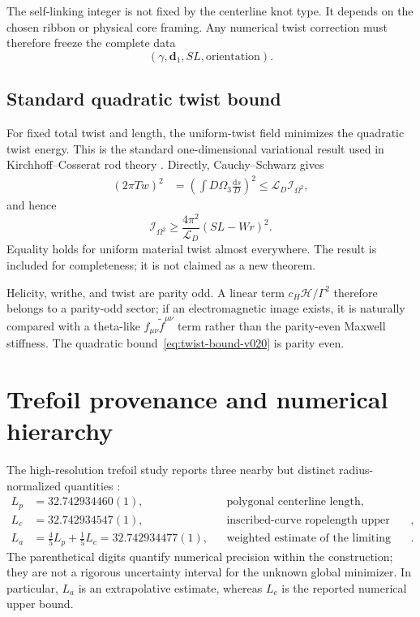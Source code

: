 \documentclass[aps,pre,preprint,notitlepage,nofootinbib,superscriptaddress]{revtex4-2}
\newcommand{\dd}{\mathrm d}
\newcommand{\calH}{\mathcal H}
\newcommand{\calL}{\mathcal L}
\newcommand{\calI}{\mathcal I}
\begin{document}
The self-linking integer is not fixed by the centerline knot type.  It depends on the chosen ribbon or physical core framing.  Any numerical twist correction must therefore freeze the complete data
\begin{equation}
  (\gamma,\bm d_1,SL,\text{orientation}).
\end{equation}

\subsection{Standard quadratic twist bound}

For fixed total twist and length, the uniform-twist field minimizes the quadratic twist energy.  This is the standard one-dimensional variational result used in Kirchhoff--Cosserat rod theory \cite{Antman2005}.  Directly, Cauchy--Schwarz gives
\begin{align}
  (2\pi Tw)^2
  &=\left(\int D\Omega_3\frac{\dd s}{D}\right)^2
  \leq \calL_D\calI_{\Omega^2},
\end{align}
and hence
\begin{equation}
  \boxed{
  \calI_{\Omega^2}\geq
  \frac{4\pi^2}{\calL_D}(SL-Wr)^2.}
  \label{eq:twist-bound-v020}
\end{equation}
Equality holds for uniform material twist almost everywhere.  The result is included for completeness; it is not claimed as a new theorem.

Helicity, writhe, and twist are parity odd.  A linear term $c_H\calH/\Gamma^2$ therefore belongs to a parity-odd sector; if an electromagnetic image exists, it is naturally compared with a theta-like $f_{\mu\nu}\widetilde f^{\mu\nu}$ term rather than the parity-even Maxwell stiffness.  The quadratic bound~\eqref{eq:twist-bound-v020} is parity even.

\section{Trefoil provenance and numerical hierarchy}
\label{sec:provenance}

The high-resolution trefoil study reports three nearby but distinct radius-normalized quantities \cite{PrzybylPieranski2014}:
\begin{align}
  L_p&=32.742934460(1), &&\text{polygonal centerline length},\\
  L_c&=32.742934547(1), &&\text{inscribed-curve ropelength upper bound},\\
  L_a&=\frac45L_p+\frac15L_c=32.742934477(1),
      &&\text{weighted estimate of the limiting value}.
\end{align}
The parenthetical digits quantify numerical precision within the construction; they are not a rigorous uncertainty interval for the unknown global minimizer.  In particular, $L_a$ is an extrapolative estimate, whereas $L_c$ is the reported numerical upper bound.
\end{document}
